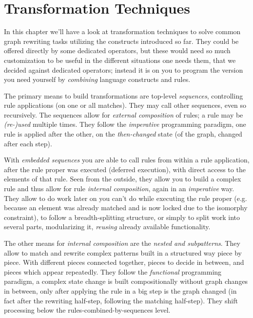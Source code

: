 \chapter{Transformation Techniques}
\label{cha:techniques}
\label{sub:mergesplit}

In this chapter we'll have a look at transformation techniques to solve common graph rewriting tasks utilizing the constructs introduced so far.
They could be offered directly by some dedicated operators,
but these would need so much customization to be useful in the different situations one needs them,
that we decided against dedicated operators;
instead it is on you to program the version you need yourself by \emph{combining} language constructs and rules.

The primary means to build transformations are top-level \emph{sequences}, controlling rule applications (on one or all matches).
They may call other sequences, even so recursively.
The sequences allow for \emph{external composition} of rules; a rule may be \emph{(re-)used} multiple times.
They follow the \emph{imperative} programming paradigm, one rule is applied after the other, on the \emph{then-changed} state (of the graph, changed after each step).

With \emph{embedded sequences} you are able to call rules from within a rule application, after the rule proper was executed (deferred execution), with direct access to the elements of that rule.
Seen from the outside, they allow you to build a complex rule and thus allow for rule \emph{internal composition}, again in an \emph{imperative} way.
They allow to do work later on you can't do while executing the rule proper (e.g. because an element was already matched and is now locked due to the isomorphy constraint), to follow a breadth-splitting structure, or simply to split work into several parts, modularizing it, \emph{reusing} already available functionality.

The other means for \emph{internal composition} are the \emph{nested and subpatterns}.
They allow to match and rewrite complex patterns built in a structured way piece by piece.
With different pieces connected together, pieces to decide in between, and pieces which appear repeatedly.
They follow the \emph{functional} programming paradigm, a complex state change is built compositionally without graph changes in between, only after applying the rule in a big step is the graph changed (in fact after the rewriting half-step, following the matching half-step). 
They shift processing below the rules-combined-by-sequences level. 

